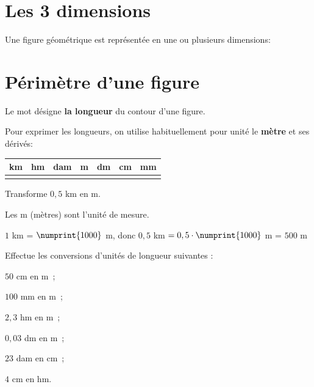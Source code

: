 \section{Les 3 dimensions}
\begin{aconnaitre}
Une figure géométrique est représentée en une ou plusieurs dimensions:
\begin{center}
    
\end{center}
\end{aconnaitre}


\section{Périmètre d'une figure}
\begin{aconnaitre}
Le mot  désigne \textbf{\textcolor{H1}{la longueur}} du contour d'une figure.
\begin{center}
   
\end{center}
Pour exprimer les longueurs, on utilise habituellement pour unité le \textbf{\textcolor{H1}{mètre}} et ses dérivés:
\begin{center}
    \begin{tabular}{|c|c|c|c|c|c|c|}
     \hline   km & hm & dam & m & dm & cm & mm \\ \hline
         & & & & & & \\
    \hline
    \end{tabular}
\end{center}
\end{aconnaitre}

\begin{methode*1}

\begin{exemple*1}
Transforme $0,5$ km en m.

Les m (mètres) sont l'unité de mesure.

$1$ km = $\numprint{1000}$ m, donc $0,5$ km $= 0,5 \cdot \numprint{1000}$ m = $500$ m
\end{exemple*1}

\exercice 
Effectue les conversions d'unités de longueur suivantes :
\begin{colenumerate}{3}
 \item $50$ cm en m ;
 \item $100$ mm en m ;
 \item $2,3$ hm en m ;
 \item $0,03$ dm en m ;
 \item $23$ dam en cm ;
 \item $4$ cm en hm.
 \end{colenumerate}

\end{methode*1}

